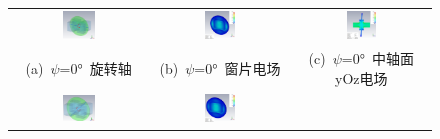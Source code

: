 \documentclass[master]{thesis-uestc}
\begin{document}
\begin{figure}[!htb]
    \small
    \centering
    \begin{tabular}{@{\ }c@{\ }c@{\ }c}
        \includegraphics[width=0.25\textwidth]{pic/chapter5/X0旋转轴.png} & 
        \hspace{5pt}
        \includegraphics[width=0.23\textwidth]{pic/chapter5/X0电场整体.png}   &
        \hspace{5pt}
        \includegraphics[width=0.23\textwidth]{pic/chapter5/X0电场切面.png}       \\
        \mbox{\small (a) \(\psi\)=0° 旋转轴}                                                                               & 
        \mbox{\small (b) \(\psi\)=0° 窗片电场}    & 
        \mbox{\small (c) \(\psi\)=0° 中轴面yOz电场}                                                                              \\[6bp]
        \includegraphics[width=0.25\textwidth]{pic/chapter5/X45旋转轴.png} & 
        \hspace{5pt}
        \includegraphics[width=0.23\textwidth]{pic/chapter5/X45电场整体.png} & 

\end{tabular}
\end{figure}
\end{document}
